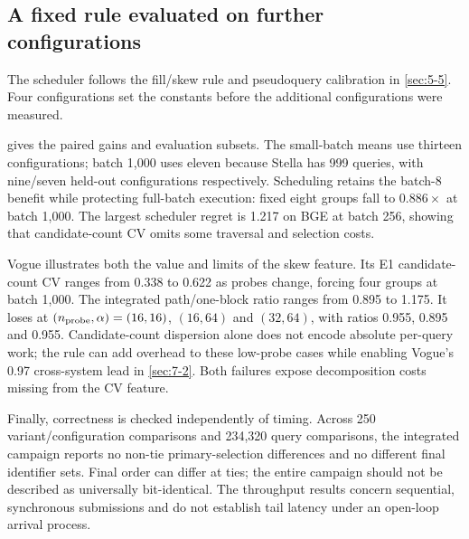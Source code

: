\subsection{A fixed rule evaluated on further configurations}

The scheduler follows the fill/skew rule and pseudoquery calibration
in \cref{sec:5-5}. Four configurations set the constants before the
additional configurations were measured.


\begin{table}[tbp]
\centering
\caption[Integrated execution and scheduling gains]{Integrated execution gains over v61 L16. Entries are geometric
 means of per-cell median paired speedups from five rounds. ``Held out''
 excludes the four configurations used to set the rule; it means held-out
 configurations, not the budget experiment's held-out query split.}
\label{tab:7-scheduling}
\small\setlength{\tabcolsep}{4pt}

\end{table}

 gives the paired gains and evaluation subsets.
The small-batch means use thirteen configurations; batch 1,000 uses
eleven because Stella has 999 queries, with nine/seven held-out
configurations respectively. Scheduling retains the batch-8 benefit
while protecting full-batch execution: fixed eight groups fall to
$0.886\times$ at batch 1,000. The largest scheduler regret is
1.217 on BGE at batch 256, showing that candidate-count CV omits
some traversal and selection costs.

Vogue illustrates both the value and limits of the skew feature. Its E1
candidate-count CV ranges from 0.338 to 0.622 as probes change, forcing
four groups at batch 1,000. The integrated path/one-block ratio ranges
from 0.895 to 1.175. It loses at $(n_{\rm probe},\alpha)=(16,16)$,
$(16,64)$ and $(32,64)$, with ratios 0.955, 0.895 and 0.955.
Candidate-count dispersion alone does not encode absolute per-query work;
the rule can add overhead to these low-probe cases while enabling Vogue's
0.97 cross-system lead in \cref{sec:7-2}. Both failures expose
decomposition costs missing from the CV feature.

Finally, correctness is checked independently of timing. Across 250
variant/configuration comparisons and 234,320 query comparisons, the
integrated campaign reports no non-tie primary-selection differences and
no different final identifier sets. Final order can differ at ties;
the entire campaign should not be described as universally bit-identical.
The throughput results concern sequential, synchronous submissions and
do not establish tail latency under an open-loop arrival process.

